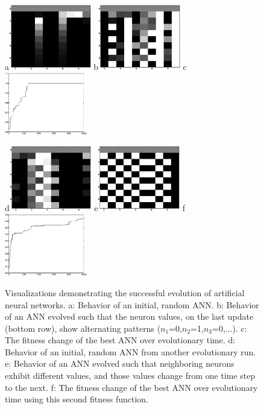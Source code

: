 \documentclass[12pt]{article}
\begin{document}
\begin{figure}[!t]
\centerline{
a\includegraphics[width=0.32\textwidth]{Fig1a.eps}
b\includegraphics[width=0.32\textwidth]{Fig1b.eps}
c\includegraphics[width=0.32\textwidth]{Fig1c.eps}
}
\centerline{
d\includegraphics[width=0.32\textwidth]{Fig1d.eps}
e\includegraphics[width=0.32\textwidth]{Fig1e.eps}
f\includegraphics[width=0.32\textwidth]{Fig1f.eps}
}
\caption{Visualizations demonstrating the successful evolution of artificial neural networks.
a: Behavior of an initial, random ANN.
b: Behavior of an ANN evolved such that the neuron values, on the last update (bottom row), show alternating patterns ($n_1$=0,$n_2$=1,$n_3$=0,...).
c: The fitness change of the best ANN over evolutionary time.
d: Behavior of an initial, random ANN from another evolutionary run.
e: Behavior of an ANN evolved such that neighboring neurons exhibit different values, and those values change from one time step to the next.
f: The fitness change of the best ANN over evolutionary time using this second fitness function.
}
\label{Fig}
\end{figure}
\end{document}
